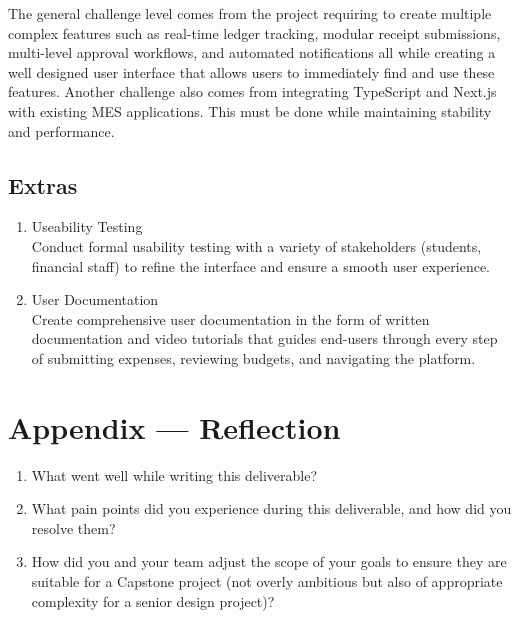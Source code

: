 \documentclass{article}
\begin{document}
\hspace{0.5cm}The general challenge level comes from the project requiring to create multiple complex features such as 
real-time ledger tracking, modular receipt submissions, multi-level approval workflows, and automated 
notifications all while creating a well designed user interface that allows users to immediately find 
and use these features. Another challenge also comes from integrating TypeScript and Next.js with existing 
MES applications. This must be done while maintaining stability and performance. 

\subsection{Extras}

\begin{enumerate}
    \item Useability Testing \\
    Conduct formal usability testing with a variety of stakeholders (students, financial staff) to refine the interface and ensure a smooth user experience.
    \item User Documentation \\
    Create comprehensive user documentation in the form of written documentation and video tutorials that guides end-users through every step of submitting expenses, reviewing budgets, and navigating the platform.
\end{enumerate}

\newpage{}

\section*{Appendix --- Reflection}




\begin{enumerate}
    \item What went well while writing this deliverable? 
    \item What pain points did you experience during this deliverable, and how
    did you resolve them?
    \item How did you and your team adjust the scope of your goals to ensure
    they are suitable for a Capstone project (not overly ambitious but also of
    appropriate complexity for a senior design project)?
\end{enumerate}  
\end{document}
